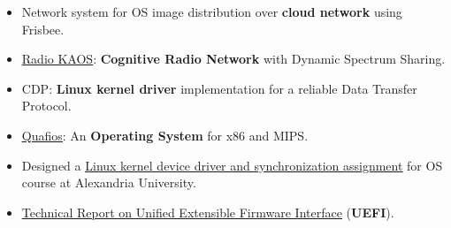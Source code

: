 \documentclass[letterpaper]{twentysecondcv} %
\newcommand{\myhy}[2]{\underline{\href{#1}{#2}}}
\begin{document}
\begin{itemize}
    \item{Network system for OS image distribution over \textbf{{cloud network}} using Frisbee.}
    \item{\myhy{https://github.com/iocoder/wncp}{Radio KAOS}: \textbf{{Cognitive Radio Network}} with Dynamic Spectrum Sharing.}
    \item{CDP: \textbf{{Linux kernel driver}} implementation for a reliable Data Transfer Protocol.}
    \item{\myhy{https://github.com/quafios/quafios}{Quafios}:
          An \textbf{{Operating System}} for x86 and MIPS.
          }
    \item{Designed a \myhy{https://github.com/iocoder/cs333_f16_lab2/raw/master/CS333_F16_Lab2.pdf}{Linux kernel device driver and synchronization assignment}
          for OS course at Alexandria University.}
    \item{\myhy{https://github.com/iocoder/uefi_report/raw/master/final_report.pdf}{Technical Report on Unified Extensible Firmware Interface}
          (\textbf{{UEFI}}).}

\end{itemize}
\end{document}
